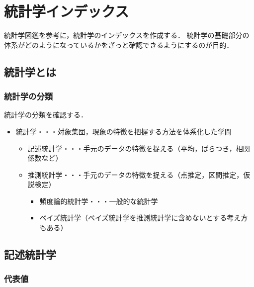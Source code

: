 
\part{統計学インデックス}

統計学図鑑\cite{統計学図鑑}を参考に，統計学のインデックスを作成する．
統計学の基礎部分の体系がどのようになっているかをざっと確認できるようにするのが目的．


\chapter{統計学とは}

\section{統計学の分類}

統計学の分類を確認する．

\begin{itemize}
  \item 統計学・・・対象集団，現象の特徴を把握する方法を体系化した学問
        \begin{itemize}
          \item 記述統計学・・・手元のデータの特徴を捉える（平均，ばらつき，相関係数など）
          \item 推測統計学・・・手元のデータの特徴を捉える（点推定，区間推定，仮説検定）
                \begin{itemize}
                  \item 頻度論的統計学・・・一般的な統計学
                  \item ベイズ統計学（ベイズ統計学を推測統計学に含めないとする考え方もある）
                \end{itemize}
        \end{itemize}
\end{itemize}


\chapter{記述統計学}

\section{代表値}
